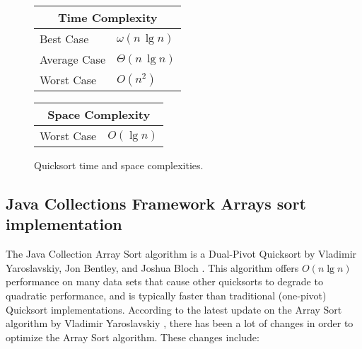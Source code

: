 \begin{figure}[!ht]
    \centering
    \begin{tabular}{l|l}
    \multicolumn{2}{c}{\textbf{Time Complexity}} \\
    \hline
    Best Case    & $\omega(n \, \lg n)$ \\
    Average Case & $\Theta(n \, \lg n)$ \\
    Worst Case   & $O(n^2)$ \\
    \end{tabular}
    \quad\quad
    \begin{tabular}{l|l}
    \multicolumn{2}{c}{\textbf{Space Complexity}} \\
    \hline
    Worst Case   & $O(\lg n)$
    \end{tabular}
    
    \caption{Quicksort time\cite{clrs2009} and space complexities\cite{big-o}.}
    \label{fig:quicksort}
\end{figure}

\subsection{Java Collections Framework Arrays sort implementation}
The Java Collection Array Sort algorithm is a Dual-Pivot Quicksort by Vladimir Yaroslavskiy, Jon Bentley, and Joshua Bloch \cite{JavaCollectionFrameworkArraysSort}. This algorithm offers $O(n \lg n)$ performance on many data sets that cause other quicksorts to degrade to quadratic performance, and is typically faster than traditional (one-pivot) Quicksort implementations. According to the latest update on the Array Sort algorithm by Vladimir Yaroslavskiy \cite{VladimirYaroslavskiy}, there has been a lot of changes in order to optimize the Array Sort algorithm. These changes include: 

